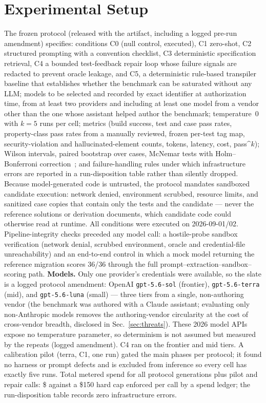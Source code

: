 \documentclass{ieeetj}
\begin{document}
\section{Experimental Setup}
\label{sec:setup}
The frozen protocol (released with the artifact, including a logged pre-run amendment) specifies:
conditions C0 (null control, executed), C1 zero-shot, C2 structured prompting with a convention
checklist, C3 deterministic specification retrieval, C4 a bounded test-feedback repair loop
whose failure signals are redacted to prevent oracle leakage, and C5, a deterministic
rule-based transpiler baseline that establishes whether the benchmark can be saturated without
any LLM; models to be selected and recorded by exact identifier at authorization time, from at
least two providers and including at least one model from a vendor other than the one whose
assistant helped author the benchmark; temperature~0 with $k{=}5$ runs per cell; metrics
(build success, test and case pass rates, property-class pass rates from a manually reviewed,
frozen per-test tag map, security-violation and hallucinated-element counts, tokens, latency,
cost, pass\textasciicircum{}$k$); Wilson intervals, paired bootstrap over cases, McNemar tests
with Holm--Bonferroni correction~\cite{miller2024errorbars, efron1979bootstrap,
dror2018hitchhiker}; and failure-handling rules under which infrastructure errors are reported
in a run-disposition table rather than silently dropped. Because model-generated code is
untrusted, the protocol mandates sandboxed candidate execution: network denied, environment
scrubbed, resource limits, and sanitized case copies that contain only the tests and the
candidate --- never the reference solutions or derivation documents, which candidate code
could otherwise read at runtime.
All conditions were executed on 2026-09-01/02. Pipeline-integrity checks preceded any model
call: a hostile-probe sandbox verification (network denial, scrubbed environment, oracle and
credential-file unreachability) and an end-to-end control in which a mock model returning the
reference migration scores 36/36 through the full prompt--extraction--sandbox--scoring path.
\textbf{Models.} Only one provider's credentials were available, so the slate is a logged
protocol amendment: OpenAI \texttt{gpt-5.6-sol} (frontier), \texttt{gpt-5.6-terra} (mid),
and \texttt{gpt-5.6-luna} (small) --- three tiers from a single, non-authoring vendor (the
benchmark was authored with a Claude assistant; evaluating only non-Anthropic models removes
the authoring-vendor circularity at the cost of cross-vendor breadth, disclosed in
Sec.~\ref{sec:threats}). These 2026 model APIs expose no temperature parameter, so
determinism is not assumed but measured by the repeats (logged amendment). C4 ran on the
frontier and mid tiers. A calibration pilot (terra, C1, one run) gated the main phases per
protocol; it found no harness or prompt defects and is excluded from inference so every cell
has exactly five runs. Total metered spend for all \PTwoGens{} protocol generations plus
pilot and \RepairCalls{} repair calls: \$\SpendTotal{} against a \$150 hard cap enforced
per call by a spend ledger; the run-disposition table records zero infrastructure errors.
\end{document}
